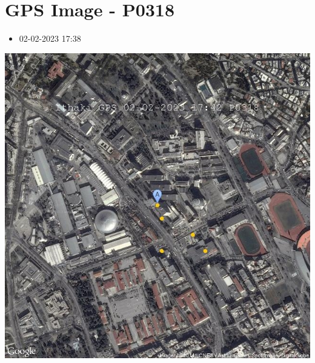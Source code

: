 \documentclass[10pt,a4paper]{article}
\begin{document}
\section*{\textlatin{GPS Image - P0318}}
\begin{itemize}
  \item 02-02-2023 17:38
\end{itemize}
\begin{center}
  \includegraphics[scale=0.4]{gpsImage.jpeg}
  \newline
  \newline
  \newline
  \newline
  \newline
  \newline
\end{center}
\end{document}
